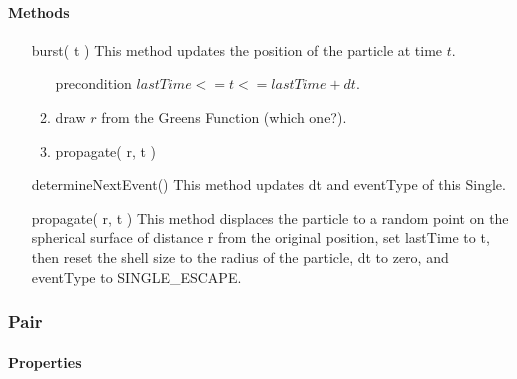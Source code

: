 \documentclass[english]{article}
\begin{document}
\paragraph{Methods}

\begin{itemize}
\item[burst( t )] This method updates the position of the particle at
  time $t$.
  \begin{enumerate}
  \item[precondition] $lastTime <= t <= lastTime + dt$.

    \item draw $r$ from the Greens Function (which one?).

    \item propagate( r, t )
  \end{enumerate}

\item[determineNextEvent()] This method updates dt and eventType of
  this Single.


\item[propagate( r, t )] This method displaces the particle to a
  random point on the spherical surface of distance r from the
  original position, set lastTime to t, then reset the shell size to
  the radius of the particle, dt to zero, and eventType to SINGLE_ESCAPE.

\end{itemize}

\subsubsection{Pair}

\paragraph{Properties}
\end{document}
